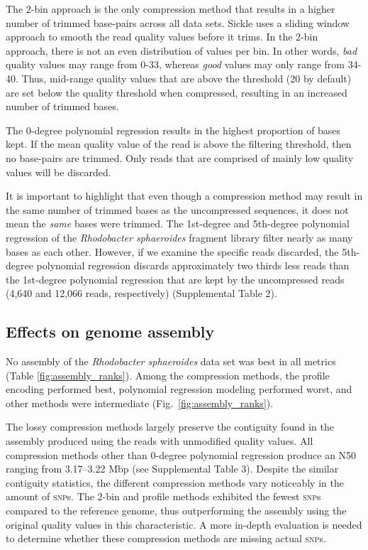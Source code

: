 \documentclass{bioinfo}
\begin{document}
The 2-bin approach is the only compression method that results in a
higher number of trimmed base-pairs across all data sets. Sickle uses
a sliding window approach to smooth the read quality values before it
trims. In the 2-bin approach, there is not an even distribution of
values per bin. In other words, \emph{bad} quality values may range
from 0-33, whereas \emph{good} values may only range from 34-40. Thus,
mid-range quality values that are above the threshold (20 by default)
are set below the quality threshold when compressed, resulting in an
increased number of trimmed bases.

The 0-degree polynomial regression results in the highest proportion
of bases kept. If the mean quality value of the read is above the
filtering threshold, then no base-pairs are trimmed. Only reads that
are comprised of mainly low quality values will be discarded.

It is important to highlight that even though a compression method may
result in the same number of trimmed bases as the uncompressed
sequences, it does not mean the \emph{same} bases were trimmed. The
1st-degree and 5th-degree polynomial regression of the
\textit{Rhodobacter sphaeroides} fragment library filter nearly as
many bases as each other. However, if we examine the specific reads
discarded, the 5th-degree polynomial regression discards approximately
two thirds less reads than the 1st-degree polynomial regression that
are kept by the uncompressed reads (4,640 and 12,066 reads,
respectively) (Supplemental Table 2).

\subsection{Effects on genome assembly}

No assembly of the \textit{Rhodobacter sphaeroides} data set was
best in all metrics (Table \ref{fig:assembly_ranks}). Among the
compression methods, the profile encoding performed best, polynomial
regression modeling performed worst, and other methods were
intermediate (Fig.~\ref{fig:assembly_ranks}).

The lossy compression methods largely preserve the contiguity found in
the assembly produced using the reads with unmodified quality
values. All compression methods other than 0-degree polynomial
regression produce an N50 ranging from 3.17--3.22 Mbp (see
Supplemental Table 3). Despite the similar contiguity statistics, the
different compression methods vary noticeably in the amount of
\textsc{snp}s. The 2-bin and profile methods exhibited the fewest
\textsc{snp}s compared to the reference genome, thus outperforming the
assembly using the original quality values in this characteristic. A
more in-depth evaluation is needed to determine whether these
compression methods are missing actual \textsc{snp}s.
\end{document}

